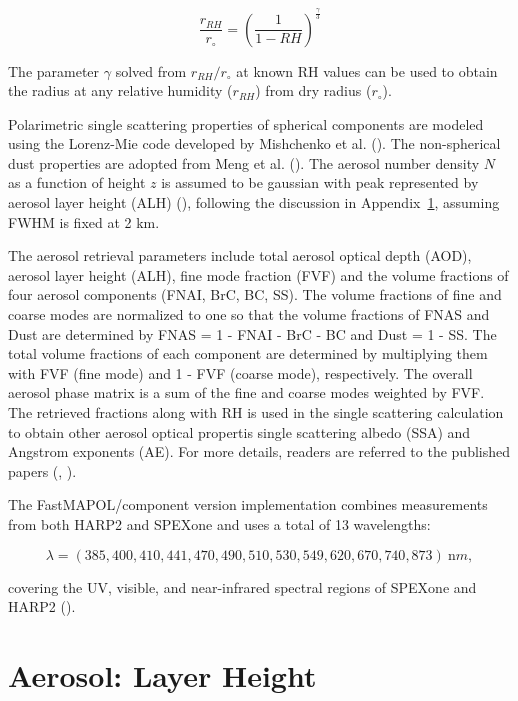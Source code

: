 \documentclass[
  11pt,
  letterpaper,
]{scrreprt}
\begin{document}
\[
\frac{r_{RH}}{r_\circ} = \left(\frac{1}{1-RH}\right)^\frac{\gamma}{3}
\]

The parameter \(\gamma\) solved from \(r_{RH}/r_\circ\) at known RH
values can be used to obtain the radius at any relative humidity
(\(r_{RH}\)) from dry radius (\(r_\circ\)).

Polarimetric single scattering properties of spherical components are
modeled using the Lorenz-Mie code developed by Mishchenko et al.
(). The non-spherical dust
properties are adopted from Meng et al.
(). The aerosol number density \(N\) as
a function of height \(z\) is assumed to be gaussian with peak
represented by aerosol layer height (ALH) (), following the discussion in
Appendix~\ref{sec-aerosol-height}, assuming FWHM is fixed at 2 km.

The aerosol retrieval parameters include total aerosol optical depth
(AOD), aerosol layer height (ALH), fine mode fraction (FVF) and the
volume fractions of four aerosol components (FNAI, BrC, BC, SS). The
volume fractions of fine and coarse modes are normalized to one so that
the volume fractions of FNAS and Dust are determined by FNAS = 1 - FNAI
- BrC - BC and Dust = 1 - SS. The total volume fractions of each
component are determined by multiplying them with FVF (fine mode) and 1
- FVF (coarse mode), respectively. The overall aerosol phase matrix is a
sum of the fine and coarse modes weighted by FVF. The retrieved
fractions along with RH is used in the single scattering calculation to
obtain other aerosol optical propertis single scattering albedo (SSA)
and Angstrom exponents (AE). For more details, readers are referred to
the published papers (,
).

The FastMAPOL/component version implementation combines measurements
from both HARP2 and SPEXone and uses a total of 13 wavelengths:

\[
\lambda =
(385,400,410,441,470,490,510,530,549,620,670,740,873)\ {\mathrm nm},
\]

covering the UV, visible, and near-infrared spectral regions of SPEXone
and HARP2 ().

\chapter{Aerosol: Layer Height}\label{sec-aerosol-height}
\end{document}
